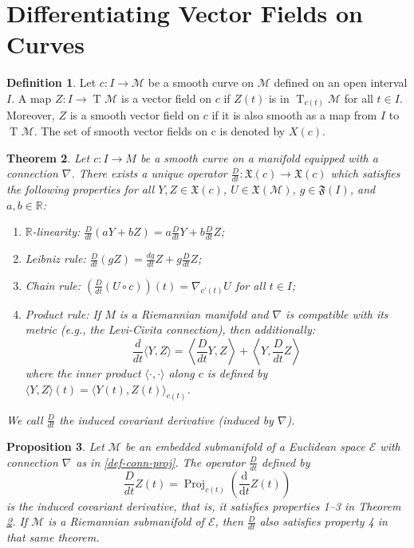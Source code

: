\documentclass{article}
\theoremstyle{plain}
\newtheorem{theorem}{Theorem}[section]
\newtheorem{proposition}[theorem]{Proposition}
\theoremstyle{definition}
\newtheorem{definition}[theorem]{Definition}
\newcommand{\deri}[2]{\frac{\text{d}{#1}}{\text{d}{#2}}}
\newcommand{\Tang}[2]{\operatorname{T}_{#1}{\mathcal{#2}}}
\newcommand{\Proj}[2]{\operatorname{Proj}_{#1}{\left(#2\right)}}
\newcommand{\Conn}[3]{#1\nabla_{#2}{#3}}
\def\calE{\mathcal{E}}
\def\calM{\mathcal{M}}
\begin{document}
\section{Differentiating Vector Fields on Curves}
\begin{definition}
Let $c : I \to \calM$ be a smooth curve on $\calM$ defined on an open interval $I$. 
A map $Z : I \to \Tang{}{M}$ is a vector field on $c$ if $Z(t)$ is in $\Tang{c(t)}{M}$ for all $t \in I$. 
Moreover, $Z$ is a smooth vector field on $c$ if it is also smooth as a map from $I$ to $\Tang{}{M}$. 
The set of smooth vector fields on c is denoted by $X(c)$. 
\end{definition}

\begin{theorem}\label{thm-induced-cov-deri}
Let $ c \colon I \to M $ be a smooth curve on a manifold equipped with a connection $\nabla$. There exists a unique operator $\frac{D}{dt} \colon \mathfrak{X}(c) \to \mathfrak{X}(c)$ which satisfies the following properties for all $ Y, Z \in \mathfrak{X}(c) $, $ U \in \mathfrak{X}(\calM) $, $ g \in \mathfrak{F}(I) $, and $ a, b \in \mathbb{R} $:

\begin{enumerate}
    \item \textit{$\mathbb{R}$-linearity}: $\frac{D}{dt}(aY + bZ) = a\frac{D}{dt}Y + b\frac{D}{dt}Z$;
    \item \textit{Leibniz rule}: $\frac{D}{dt}(gZ) = \frac{dg}{dt}Z + g\frac{D}{dt}Z$;
    \item \textit{Chain rule}: $\left(\frac{D}{dt}(U \circ c)\right)(t) = \nabla_{c'(t)}U$ for all $t \in I$;
    \item \textit{Product rule}: If $M$ is a Riemannian manifold and $\nabla$ is compatible with its metric (e.g., the Levi-Civita connection), then additionally:
    $$
    \frac{d}{dt}\langle Y, Z \rangle = \left\langle \frac{D}{dt}Y, Z \right\rangle + \left\langle Y, \frac{D}{dt}Z \right\rangle
    $$
    where the inner product $\langle \cdot, \cdot \rangle$ along $c$ is defined by $\langle Y, Z \rangle(t) = \langle Y(t), Z(t) \rangle_{c(t)}$.
\end{enumerate}

We call $\frac{D}{dt}$ the \textit{induced covariant derivative} (induced by $\nabla$). 
\end{theorem}

\begin{proposition}
Let $\calM$ be an embedded submanifold of a Euclidean space $\calE$ with connection $\Conn{}{}{}$ as in \ref{def-conn-proj}. The operator $\frac{D}{dt}$ defined by $$\frac{D}{dt} Z(t) = \Proj{c(t)}{\deri{}{t} Z(t)} \label{def-induced-cov-deri}$$ is the induced
covariant derivative, that is, it satisfies properties 1–3 in Theorem \ref{thm-induced-cov-deri}. If $\calM$ is a Riemannian submanifold of $\calE$, then $\frac{D}{dt}$ also satisfies property 4 in that same theorem.
\end{proposition}
\end{document}
